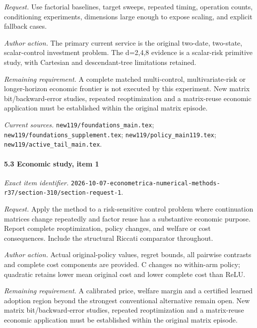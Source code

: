 \par\emph{Request.} Use factorial baselines, target sweeps, repeated timing, operation counts, conditioning experiments, dimensions large enough to expose scaling, and explicit fallback cases.

\par\emph{Author action.} The primary current service is the original two-date, two-state, scalar-control investment problem. The d=2,4,8 evidence is a scalar-risk primitive study, with Cartesian and descendant-tree limitations retained.

\par\emph{Remaining requirement.} A complete matched multi-control, multivariate-risk or longer-horizon economic frontier is not executed by this experiment. New matrix bit/\allowbreak{}backward-error studies, repeated reoptimization and a matrix-reuse economic application must be established within the original matrix episode.

\par\emph{Current sources.} \nolinkurl{new119/foundations_main.tex}; \nolinkurl{new119/foundations_supplement.tex}; \nolinkurl{new119/policy_main119.tex}; \nolinkurl{new119/active_tail_main.tex}.

\paragraph{5.3 Economic study, item 1}

\emph{Exact item identifier.} \nolinkurl{2026-10-07-econometrica-numerical-methods-r37/section-310/section-request-1}.

\par\emph{Request.} Apply the method to a risk-sensitive control problem where continuation matrices change repeatedly and factor reuse has a substantive economic purpose. Report complete reoptimization, policy changes, and welfare or cost consequences. Include the structural Riccati comparator throughout.

\par\emph{Author action.} Actual original-policy values, regret bounds, all pairwise contrasts and complete cost components are provided. C changes no within-arm policy; quadratic retains lower mean original cost and lower complete cost than ReLU.

\par\emph{Remaining requirement.} A calibrated price, welfare margin and a certified learned adoption region beyond the strongest conventional alternative remain open. New matrix bit/\allowbreak{}backward-error studies, repeated reoptimization and a matrix-reuse economic application must be established within the original matrix episode.

